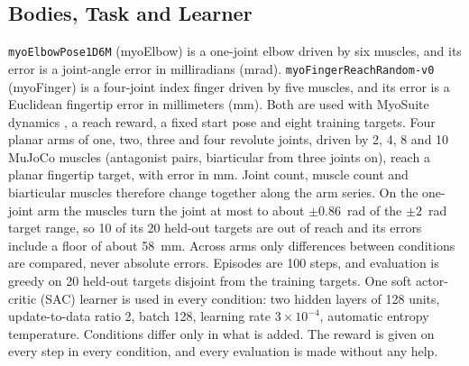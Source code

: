 \documentclass[journal]{IEEEtran}
\begin{document}
\subsection{Bodies, Task and Learner}
\texttt{myoElbowPose1D6M} (myoElbow) is a one-joint elbow driven by six muscles, and its error is
a joint-angle error in milliradians (mrad). \texttt{myoFingerReachRandom-v0} (myoFinger)
is a four-joint index finger driven by five muscles, and its error is a Euclidean
fingertip error in millimeters (mm). Both are used with MyoSuite dynamics
\cite{caggiano2022}, a reach reward, a fixed start pose and eight training
targets. Four planar arms of one, two, three and four revolute joints, driven
by 2, 4, 8 and 10 MuJoCo \cite{todorov2012} muscles (antagonist pairs, biarticular from
three joints on), reach a planar fingertip target, with error in mm. Joint count,
muscle count and biarticular muscles therefore change together along the arm
series. On the one-joint arm the muscles turn the joint at most to about $\pm0.86$~rad
of the $\pm2$~rad target range, so 10 of its 20 held-out targets are out of
reach and its errors include a floor of about 58~mm. Across arms only
differences between conditions are compared, never absolute errors. Episodes
are 100 steps, and evaluation is greedy on 20 held-out targets disjoint from the
training targets. One soft actor-critic (SAC) \cite{haarnoja2018,haarnoja2018b}
learner is used in every condition: two hidden layers of 128 units,
update-to-data ratio 2, batch 128, learning rate $3\times10^{-4}$, automatic
entropy temperature. Conditions differ only in what is added. The reward is
given on every step in every condition, and every evaluation is made without
any help.
\end{document}
